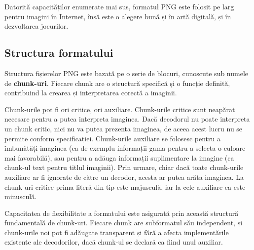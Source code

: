 \documentclass[a4paper,12pt]{report}
\begin{document}
Datorită capacităților enumerate mai sus, formatul \ac{PNG} este folosit
pe larg pentru imagini în Internet, însă este o alegere bună și în artă digitală,
și în dezvoltarea jocurilor.


\subsection{Structura formatului}

Structura fișierelor \ac{PNG} este bazată pe o serie de blocuri,
cunoscute sub numele de \textbf{chunk-uri}\cite[3.]{png_spec}.
Fiecare chunk are o structură specifică și o funcție definită,
contribuind la crearea și interpretarea corectă a imaginii.

Chunk-urile pot fi ori critice, ori auxiliare.
Chunk-urile critice sunt neapărat necesare pentru a putea interpreta imaginea.
Dacă decodorul nu poate interpreta un chunk critic, nici nu va putea prezenta imaginea,
de aceea acest lucru nu se permite conform specificației.
Chunk-urile auxiliare se folosesc pentru a îmbunătăți imaginea 
(ca de exemplu informații gama pentru a selecta o culoare mai favorabilă),
sau pentru a adăuga informații suplimentare la imagine
(ca chunk-ul text pentru titlul imaginii).
Prin urmare, chiar dacă toate chunk-urile auxiliare ar fi ignorate de către un decodor,
acesta ar putea arăta imaginea.
La chunk-uri critice prima literă din tip este majusculă,
iar la cele auxiliare ea este minusculă.

Capacitatea de flexibilitate a formatului este asigurată prin această structură fundamentală de chunk-uri.
Fiecare chunk are subformatul său independent,
și chunk-urile noi pot fi adăugate transparent și fără a afecta
implementările existente ale decodorilor,
dacă chunk-ul se declară ca fiind unul auxiliar.
\end{document}
